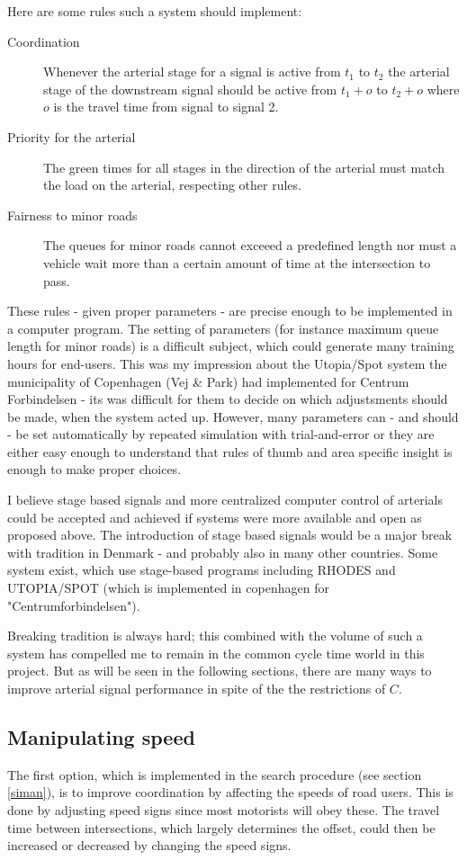 Here are some rules such a system should implement:

\begin{description}
\item[Coordination]
Whenever the arterial stage for a signal is active from $t_1$ to $t_2$ the arterial stage of the downstream signal should be active from $t_1 + o$ to $t_2 + o$ where $o$ is the travel time from signal to signal 2.
\item[Priority for the arterial]
The green times for all stages in the direction of the arterial must match the load on the arterial, respecting other rules.
\item[Fairness to minor roads]
The queues for minor roads cannot exceeed a predefined length nor must a vehicle wait more than a certain amount of time at the intersection to pass.
\end{description}

These rules - given proper parameters - are precise enough to be implemented in a computer program. The setting of parameters (for instance maximum queue length for minor roads) is a difficult subject, which could generate many training hours for end-users. This was my impression about the Utopia/Spot system the municipality of Copenhagen (Vej \& Park) had implemented for Centrum Forbindelsen - its was difficult for them to decide on which adjustsments should be made, when the system acted up. 
However, many parameters can - and should - be set automatically by repeated simulation with trial-and-error or they are either easy enough to understand that rules of thumb and area specific insight is enough to make proper choices.

I believe stage based signals and more centralized computer control of arterials could be accepted and achieved if systems were more available and open as proposed above. The introduction of stage based signals would be a major break with tradition in Denmark - and probably also in many other countries. Some system exist, which use stage-based programs including RHODES \cite{rhodes} and UTOPIA/SPOT \cite{utopia_spot} (which is implemented in copenhagen for "Centrumforbindelsen").

Breaking tradition is always hard; this combined with the volume of such a system has compelled me to remain in the common cycle time world in this project. But as will be seen in the following sections, there are many ways to improve arterial signal performance in spite of the the restrictions of $C$.

\subsection{Manipulating speed}
The first option, which is implemented in the search procedure (see section \ref{siman}), is to improve coordination by affecting the speeds of road users. This is done by adjusting speed signs since most motorists will obey these. The travel time between intersections, which largely determines the offset, could then be increased or decreased by changing the speed signs. 

